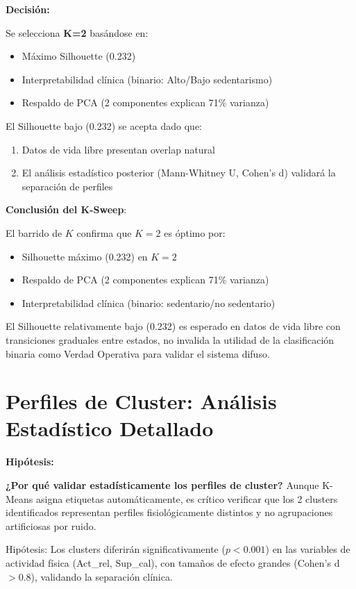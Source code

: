 \documentclass[12pt,letterpaper,twoside]{report}
\begin{document}
\begin{decisionbox}
\textbf{Decisión:}

Se selecciona \textbf{K=2} basándose en:
\begin{itemize}[noitemsep]
    \item Máximo Silhouette (0.232)
    \item Interpretabilidad clínica (binario: Alto/Bajo sedentarismo)
    \item Respaldo de PCA (2 componentes explican 71\% varianza)
\end{itemize}

El Silhouette bajo (0.232) se acepta dado que:
\begin{enumerate}[noitemsep]
    \item Datos de vida libre presentan overlap natural
    \item El análisis estadístico posterior (Mann-Whitney U, Cohen's d) validará la separación de perfiles
\end{enumerate}
\end{decisionbox}

\begin{conclusionbox}
\textbf{Conclusión del K-Sweep}:

El barrido de $K$ confirma que $K=2$ es óptimo por:
\begin{itemize}[noitemsep]
    \item Silhouette máximo (0.232) en $K=2$
    \item Respaldo de PCA (2 componentes explican 71\% varianza)
    \item Interpretabilidad clínica (binario: sedentario/no sedentario)
\end{itemize}

El Silhouette relativamente bajo (0.232) es esperado en datos de vida libre con transiciones graduales entre estados, no invalida la utilidad de la clasificación binaria como Verdad Operativa para validar el sistema difuso.
\end{conclusionbox}

\section{Perfiles de Cluster: Análisis Estadístico Detallado}

\begin{hipotesisbox}
\textbf{Hipótesis:}

\textbf{¿Por qué validar estadísticamente los perfiles de cluster?} Aunque K-Means asigna etiquetas automáticamente, es crítico verificar que los 2 clusters identificados representan perfiles fisiológicamente distintos y no agrupaciones artificiosas por ruido.

Hipótesis: Los clusters diferirán significativamente ($p < 0.001$) en las variables de actividad física (Act\_rel, Sup\_cal), con tamaños de efecto grandes (Cohen's d $> 0.8$), validando la separación clínica.
\end{hipotesisbox}
\end{document}
